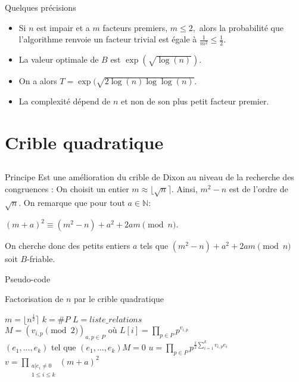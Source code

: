 \documentclass[utf8,10pt,french]{beamer}
\newcommand{\N}{\mathbb{N}}
\DeclareMathOperator{\pgcd}{pgcd}
\begin{document}
\begin{frame}{Quelques précisions}
\begin{itemize}
\item Si $n$ est impair et a $m$ facteurs premiers, $m \leq 2,$ alors la probabilité que l'algorithme renvoie un facteur trivial est égale à $\frac{1}{m^2} \leq \frac{1}{2}.$ \pause
\item La valeur optimale de $B$ est $\exp(\sqrt{\log(n)}).$
\item On a alors $T = \exp(\sqrt{2\log(n)\log\log(n)}.$
\item La complexité dépend de $n$ et non de son plus petit facteur premier.  
\end{itemize}
\end{frame}

\section{Crible quadratique}
\subsection{}
\begin{frame}{Principe}
Est une amélioration du crible de Dixon au niveau de la recherche des congruences : \pause
On choisit un entier $m \approx \lfloor\sqrt{n}\rceil.$ Ainsi, $m^2 - n$ est de l'ordre de $\sqrt{n}.$ \pause
On remarque que pour tout $a \in \N :$
\begin{center}
$(m + a)^2 \equiv (m^2 - n) + a^2 + 2am \pmod n.$
\end{center} \pause
On cherche donc des petits entiers $a$ tels que $(m^2 - n) + a^2 + 2am \pmod n$ soit $B$-friable.
\end{frame}

\begin{frame}{Pseudo-code}
\begin{algorithm}
\caption{Factorisation de $n$ par le crible quadratique}
\BlankLine
$m = \lfloor n^{\frac{1}{2}} \rceil$\;
$k = \#P$\;
$L = liste\_relations$\;
$M = (v_{i, p} \pmod 2)_{a, p \in P} \text{ où } L[i] = \prod\limits_{p \in P}p^{v_{i,p}}$\;
$(e_1, ..., e_k) \text{ tel que } (e_1, ..., e_k)M = 0$\;
$u = \prod\limits_{p \in P} p^{\frac{1}{2} \sum\limits_{i=1}^k v_{i, p}e_i}$\;
$v = \prod\limits_{\substack{a | e_i \neq 0 \\ 1 \leq i \leq k}} (m + a)^2$\;
\Return{$\pgcd(u - v, n)$}
\end{algorithm}
\end{frame}
\end{document}
